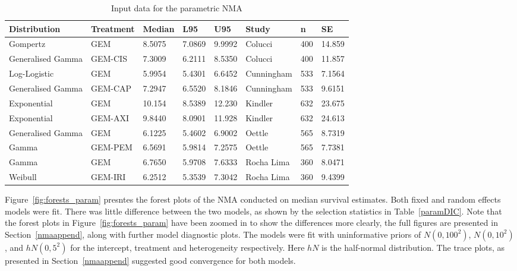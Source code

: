 \begin{table}[h]
    \center
    \begin{tabular}{llllllll}
    \hline
    Distribution      & Treatment & Median  & L95    & U95     & Study      & n   & SE      \\ \hline
    Gompertz          & GEM       & 8.5075  & 7.0869 & 9.9992  & Colucci    & 400 & 14.859 \\
    Generalised Gamma & GEM-CIS   & 7.3009  & 6.2111 & 8.5350  & Colucci    & 400 & 11.857 \\
    Log-Logistic      & GEM       & 5.9954  & 5.4301 & 6.6452  & Cunningham & 533 & 7.1564  \\
    Generalised Gamma & GEM-CAP   & 7.2947  & 6.5520 & 8.1846  & Cunningham & 533 & 9.6151  \\
    Exponential       & GEM       & 10.154  & 8.5389 & 12.230  & Kindler    & 632 & 23.675 \\
    Exponential       & GEM-AXI   & 9.8440  & 8.0901 & 11.928  & Kindler    & 632 & 24.613 \\
    Generalised Gamma & GEM       & 6.1225  & 5.4602 & 6.9002  & Oettle     & 565 & 8.7319  \\
    Gamma             & GEM-PEM   & 6.5691  & 5.9814 & 7.2575  & Oettle     & 565 & 7.7381  \\
    Gamma             & GEM       & 6.7650  & 5.9708 & 7.6333  & Rocha Lima & 360 & 8.0471  \\
    Weibull           & GEM-IRI   & 6.2512  & 5.3539 & 7.3042  & Rocha Lima & 360 & 9.4399  \\ \hline
    \end{tabular}
    \caption{Input data for the parametric NMA}
    \label{paramNMAInputs}
\end{table}

Figure~\ref{fig:forests_param} presntes the forest plots of the NMA conducted on median survival estimates. Both fixed and random effects models were fit. There was little difference between the two models, as shown by the selection statistics in Table~\ref{paramDIC}. Note that the forest plots in Figure~\ref{fig:forests_param} have been zoomed in to show the differences more clearly, the full figures are presented in Section~\ref{nmaappend}, along with further model diagnostic plots. The models were fit with uninformative priors of $N(0, 100^2)$, $N(0, 10^2)$, and $hN(0, 5^2)$ for the intercept, treatment and heterogeneity respectively. Here $hN$ is the half-normal distribution. The trace plots, as presented in Section~\ref{nmaappend} suggested good convergence for both models. 

